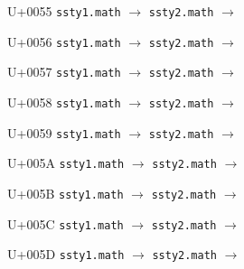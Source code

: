 \documentclass{article}
\begin{document}
\begin{substitutions}
\goodbreak

U+0055  \linebreak
    \texttt{ssty1.math} $\to$  \linebreak
    \texttt{ssty2.math} $\to$  

\goodbreak

U+0056  \linebreak
    \texttt{ssty1.math} $\to$  \linebreak
    \texttt{ssty2.math} $\to$  

\goodbreak

U+0057  \linebreak
    \texttt{ssty1.math} $\to$  \linebreak
    \texttt{ssty2.math} $\to$  

\goodbreak

U+0058  \linebreak
    \texttt{ssty1.math} $\to$  \linebreak
    \texttt{ssty2.math} $\to$  

\goodbreak

U+0059  \linebreak
    \texttt{ssty1.math} $\to$  \linebreak
    \texttt{ssty2.math} $\to$  

\goodbreak

U+005A  \linebreak
    \texttt{ssty1.math} $\to$  \linebreak
    \texttt{ssty2.math} $\to$  

\goodbreak

U+005B  \linebreak
    \texttt{ssty1.math} $\to$  \linebreak
    \texttt{ssty2.math} $\to$  

\goodbreak

U+005C  \linebreak
    \texttt{ssty1.math} $\to$  \linebreak
    \texttt{ssty2.math} $\to$  

\goodbreak

U+005D  \linebreak
    \texttt{ssty1.math} $\to$  \linebreak
    \texttt{ssty2.math} $\to$  


\end{substitutions}
\end{document}

